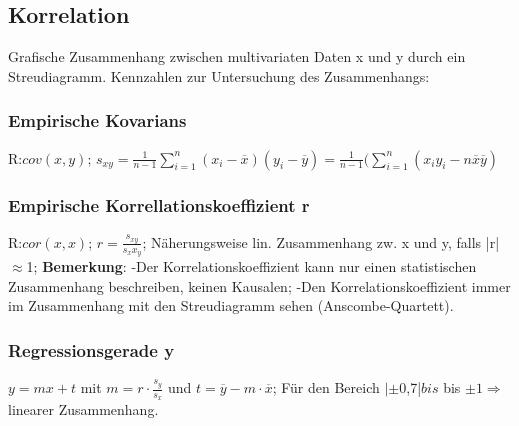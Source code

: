       \subsection{Korrelation}
      Grafische Zusammenhang zwischen multivariaten Daten x und y durch ein Streudiagramm. Kennzahlen zur Untersuchung des Zusammenhangs:
      \subsubsection{Empirische Kovarians}
      R:$cov(x,y)$;
      $s_{xy} = \frac{1}{n-1}\sum_{i=1}^{n}(x_{i}-\overline{x})(y_{i}-\overline{y})=\frac{1}{n-1}(\sum_{i=1}^{n}(x_{i}y_{i}- n\overline{x}\overline{y})$
      \subsubsection{Empirische Korrellationskoeffizient r}
      R:$cor(x,x)$;
      $r = \frac{s_{xy}}{s_{x}x_{y}}$; Näherungsweise lin. Zusammenhang zw. x und y, falls |r| $\approx$1;
      \textbf{Bemerkung}: -Der Korrelationskoeffizient kann nur einen statistischen Zusammenhang beschreiben, keinen Kausalen; -Den Korrelationskoeffizient immer im Zusammenhang mit den Streudiagramm sehen (Anscombe-Quartett).
      \subsubsection{Regressionsgerade y}
      $y = mx + t$ mit $m=r \cdot \frac{s_{y}}{s_{x}}$ und $ t=\overline{y} -m \cdot \overline{x}$;
      Für den Bereich $|\pm$0,7|$ bis $ bis $\pm 1   \Rightarrow $ linearer Zusammenhang.